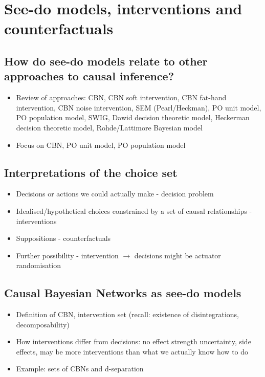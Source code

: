 
\chapter{See-do models, interventions and counterfactuals}\label{ch:ints_counterfactuals}


\section{How do see-do models relate to other approaches to causal inference?}

\begin{itemize}
    \item Review of approaches: CBN, CBN soft intervention, CBN fat-hand intervention, CBN noise intervention, SEM (Pearl/Heckman), PO unit model, PO population model, SWIG, Dawid decision theoretic model, Heckerman decision theoretic model, Rohde/Lattimore Bayesian model
    \item Focus on CBN, PO unit model, PO population model
\end{itemize}


\section{Interpretations of the choice set}

\begin{itemize}
    \item Decisions or actions we could actually make - decision problem
    \item Idealised/hypothetical choices constrained by a set of causal relationships - interventions
    \item Suppositions - counterfactuals
    \item Further possibility - intervention $\to$ decisions might be actuator randomisation
\end{itemize}

\section{Causal Bayesian Networks as see-do models}

\begin{itemize}
    \item Definition of CBN, intervention set (recall: existence of disintegrations, decomposability)
    \item How interventions differ from decisions: no effect strength uncertainty, side effects, may be more interventions than what we actually know how to do
    \item Example: sets of CBNs and d-separation
\end{itemize}

